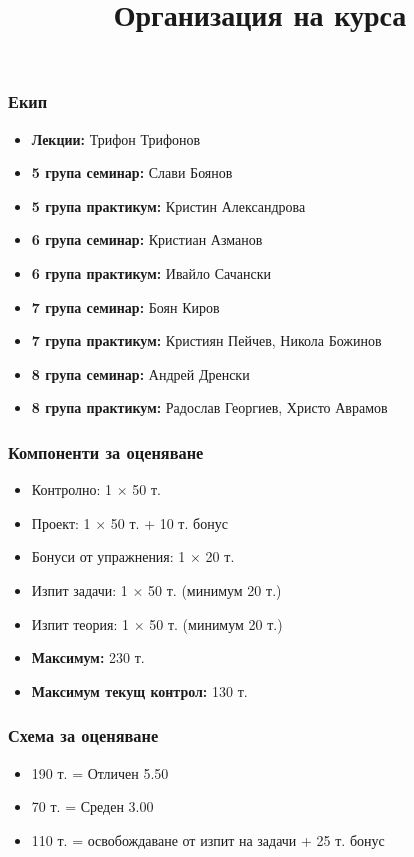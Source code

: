 \documentclass{beamer}
\title{Организация на курса}
\begin{document}
\begin{frame}
  \titlepage
\end{frame}

\begin{frame}
  \frametitle{Екип}

  \begin{itemize}
  \item \textbf{Лекции:} Трифон Трифонов
  \item \textbf{5 група семинар:} Слави Боянов
  \item \textbf{5 група практикум:} Кристин Александрова
  \item \textbf{6 група семинар:} Кристиан Азманов
  \item \textbf{6 група практикум:} Ивайло Сачански
  \item \textbf{7 група семинар:} Боян Киров
  \item \textbf{7 група практикум:} Кристиян Пейчев, Никола Божинов
  \item \textbf{8 група семинар:} Андрей Дренски
  \item \textbf{8 група практикум:} Радослав Георгиев, Христо Аврамов
  \end{itemize}
\end{frame}

\begin{frame}
  \frametitle{Компоненти за оценяване}

  \begin{itemize}
  \item Контролно: 1 $\times$ 50 т.
  \item Проект: 1 $\times$ 50 т. + 10 т. бонус
  \item Бонуси от упражнения: 1 $\times$ 20 т.
  \item Изпит задачи: 1 $\times$ 50 т. (минимум 20 т.)
  \item Изпит теория: 1 $\times$ 50 т. (минимум 20 т.)
  \item \textbf{Максимум:} 230 т.
  \item \textbf{Максимум текущ контрол:} 130 т.
  \end{itemize}
\end{frame}

\begin{frame}
  \frametitle{Схема за оценяване}

  \begin{itemize}
  \item 190 т. = Отличен 5.50
  \item 70 т. = Среден 3.00
  \item 110 т. = освобождаване от изпит на задачи + 25 т. бонус
  \end{itemize}
\end{frame}
\end{document}
